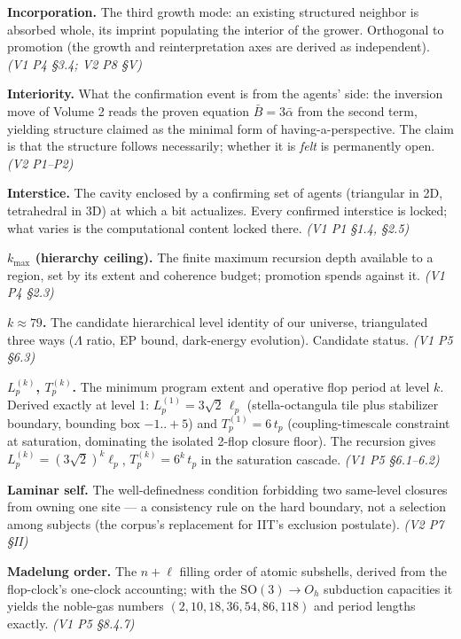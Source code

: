 \documentclass[11pt,oneside]{report}
\theoremstyle{definition}
\theoremstyle{remark}
\begin{document}
\textbf{Incorporation.} The third growth mode: an existing structured neighbor is absorbed whole, its imprint populating the interior of the grower. Orthogonal to promotion (the growth and reinterpretation axes are derived as independent). \emph{(V1 P4 \S 3.4; V2 P8 \S V)}

\textbf{Interiority.} What the confirmation event is from the agents' side: the inversion move of Volume 2 reads the proven equation $\bar{B}=3\bar{\alpha}$ from the second term, yielding structure claimed as the minimal form of having-a-perspective. The claim is that the structure follows necessarily; whether it is \emph{felt} is permanently open. \emph{(V2 P1--P2)}

\textbf{Interstice.} The cavity enclosed by a confirming set of agents (triangular in 2D, tetrahedral in 3D) at which a bit actualizes. Every confirmed interstice is locked; what varies is the computational content locked there. \emph{(V1 P1 \S 1.4, \S 2.5)}

\textbf{$k_{\max}$ (hierarchy ceiling).} The finite maximum recursion depth available to a region, set by its extent and coherence budget; promotion spends against it. \emph{(V1 P4 \S 2.3)}

\textbf{$k \approx 79$.} The candidate hierarchical level identity of our universe, triangulated three ways ($\Lambda$ ratio, EP bound, dark-energy evolution). Candidate status. \emph{(V1 P5 \S 6.3)}

\textbf{$L_p^{(k)}$, $T_p^{(k)}$.} The minimum program extent and operative flop period at level $k$. Derived exactly at level 1: $L_p^{(1)} = 3\sqrt{2}\,\ell_p$ (stella-octangula tile plus stabilizer boundary, bounding box $-1..+5$) and $T_p^{(1)} = 6\,t_p$ (coupling-timescale constraint at saturation, dominating the isolated 2-flop closure floor). The recursion gives $L_p^{(k)} = (3\sqrt{2})^k \ell_p$, $T_p^{(k)} = 6^k\,t_p$ in the saturation cascade. \emph{(V1 P5 \S 6.1--6.2)}

\textbf{Laminar self.} The well-definedness condition forbidding two same-level closures from owning one site --- a consistency rule on the hard boundary, not a selection among subjects (the corpus's replacement for IIT's exclusion postulate). \emph{(V2 P7 \S II)}

\textbf{Madelung order.} The $n+\ell$ filling order of atomic subshells, derived from the flop-clock's one-clock accounting; with the $\mathrm{SO}(3)\to O_h$ subduction capacities it yields the noble-gas numbers $(2, 10, 18, 36, 54, 86, 118)$ and period lengths exactly. \emph{(V1 P5 \S 8.4.7)}
\end{document}
